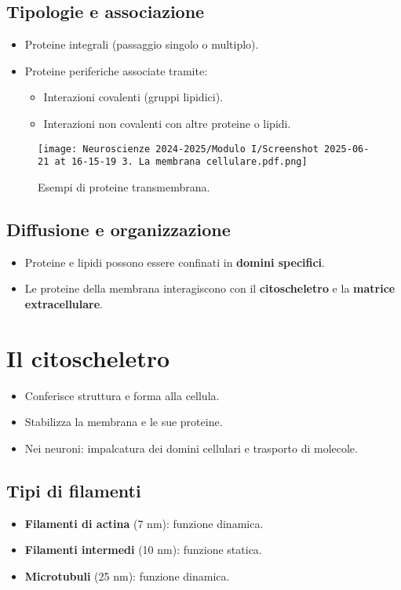 \documentclass[a4paper,12pt]{article}
\begin{document}
\subsection*{Tipologie e associazione}
\begin{itemize}
    \item Proteine integrali (passaggio singolo o multiplo).
    \item Proteine periferiche associate tramite:
    \begin{itemize}
        \item Interazioni covalenti (gruppi lipidici).
        \item Interazioni non covalenti con altre proteine o lipidi.
    \end{itemize}
\end{itemize}

\begin{figure}[h!]
    \centering
    \texttt{[image: Neuroscienze 2024-2025/Modulo I/Screenshot 2025-06-21 at 16-15-19 3. La membrana cellulare.pdf.png]}
    \caption{Esempi di proteine transmembrana.}
\end{figure}

\subsection*{Diffusione e organizzazione}

\begin{itemize}
    \item Proteine e lipidi possono essere confinati in \textbf{domini specifici}.
    \item Le proteine della membrana interagiscono con il \textbf{citoscheletro} e la \textbf{matrice extracellulare}.
\end{itemize}

\section*{Il citoscheletro}

\begin{itemize}
    \item Conferisce struttura e forma alla cellula.
    \item Stabilizza la membrana e le sue proteine.
    \item Nei neuroni: impalcatura dei domini cellulari e trasporto di molecole.
\end{itemize}

\subsection*{Tipi di filamenti}
\begin{itemize}
    \item \textbf{Filamenti di actina} (7 nm): funzione dinamica.
    \item \textbf{Filamenti intermedi} (10 nm): funzione statica.
    \item \textbf{Microtubuli} (25 nm): funzione dinamica.
\end{itemize}
\end{document}
